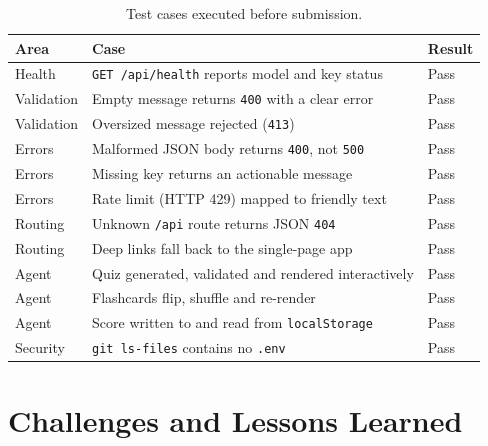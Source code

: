 \documentclass[11pt,a4paper]{article}
\begin{document}
\begin{table}[h]
\centering
\caption{Test cases executed before submission.}
\begin{tabular}{@{}lp{6.4cm}l@{}}
\toprule
\textbf{Area} & \textbf{Case} & \textbf{Result} \\
\midrule
Health     & \texttt{GET /api/health} reports model and key status & Pass \\
Validation & Empty message returns \texttt{400} with a clear error & Pass \\
Validation & Oversized message rejected (\texttt{413}) & Pass \\
Errors     & Malformed JSON body returns \texttt{400}, not \texttt{500} & Pass \\
Errors     & Missing key returns an actionable message & Pass \\
Errors     & Rate limit (HTTP 429) mapped to friendly text & Pass \\
Routing    & Unknown \texttt{/api} route returns JSON \texttt{404} & Pass \\
Routing    & Deep links fall back to the single-page app & Pass \\
Agent      & Quiz generated, validated and rendered interactively & Pass \\
Agent      & Flashcards flip, shuffle and re-render & Pass \\
Agent      & Score written to and read from \texttt{localStorage} & Pass \\
Security   & \texttt{git ls-files} contains no \texttt{.env} & Pass \\
\bottomrule
\end{tabular}
\end{table}

\section{Challenges and Lessons Learned}
\end{document}

